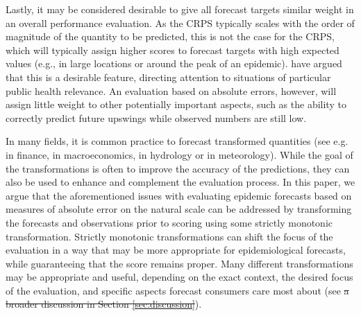 \documentclass[10pt,letterpaper]{article} %
\providecommand{\DIFaddtex}[1]{{\protect\color{blue}\uwave{#1}}} %
\providecommand{\DIFdeltex}[1]{{\protect\color{red}\sout{#1}}}                      %
\providecommand{\DIFaddbegin}{} %
\providecommand{\DIFaddend}{} %
\providecommand{\DIFdelbegin}{} %
\providecommand{\DIFdelend}{} %
\providecommand{\DIFadd}[1]{\texorpdfstring{\DIFaddtex{#1}}{#1}} %
\providecommand{\DIFdel}[1]{\texorpdfstring{\DIFdeltex{#1}}{}} %
\newcommand{\DIFscaledelfig}{0.5}
\newlength{\DIFdelgraphicswidth} %
\newlength{\DIFdelgraphicsheight} %
\newcommand{\DIFaddincludegraphics}[2][]{{\color{blue}\fbox{\DIFOincludegraphics[#1]{#2}}}} %
\newcommand{\DIFdelincludegraphics}[2][]{%
\sbox{\DIFdelgraphicsbox}{\DIFOincludegraphics[#1]{#2}}%
\settoboxwidth{\DIFdelgraphicswidth}{\DIFdelgraphicsbox} %
\settoboxtotalheight{\DIFdelgraphicsheight}{\DIFdelgraphicsbox} %
\scalebox{\DIFscaledelfig}{%
\parbox[b]{\DIFdelgraphicswidth}{\usebox{\DIFdelgraphicsbox}\\[-\baselineskip] \rule{\DIFdelgraphicswidth}{0em}}\llap{\resizebox{\DIFdelgraphicswidth}{\DIFdelgraphicsheight}{%
\setlength{\unitlength}{\DIFdelgraphicswidth}%
\begin{picture}(1,1)%
\thicklines\linethickness{2pt} %
{\color[rgb]{1,0,0}\put(0,0){\framebox(1,1){}}}%
{\color[rgb]{1,0,0}\put(0,0){\line( 1,1){1}}}%
{\color[rgb]{1,0,0}\put(0,1){\line(1,-1){1}}}%
\end{picture}%
}\hspace*{3pt}}} %
} %
\DeclareRobustCommand{\DIFaddbegin}{\DIFOaddbegin \let\includegraphics\DIFaddincludegraphics} %
\DeclareRobustCommand{\DIFaddend}{\DIFOaddend \let\includegraphics\DIFOincludegraphics} %
\DeclareRobustCommand{\DIFdelbegin}{\DIFOdelbegin \let\includegraphics\DIFdelincludegraphics} %
\DeclareRobustCommand{\DIFdelend}{\DIFOaddend \let\includegraphics\DIFOincludegraphics} %
\begin{document}
Lastly, it may be considered desirable to give all forecast targets similar weight in an overall performance evaluation. As the CRPS typically scales with the order of magnitude of the quantity to be predicted, this is not the case for the CRPS, which will typically assign higher scores to forecast targets with high expected values (e.g., in large locations or around the peak of an epidemic). \cite{bracherEvaluatingEpidemicForecasts2021} have argued that this is a desirable feature, directing attention to situations of particular public health relevance. An evaluation based on absolute errors, however, will assign little weight to other potentially important aspects, such as the ability to correctly predict future upswings while observed numbers are still low. 

In many fields, it is common practice to forecast transformed quantities (see e.g. \cite{taylorEvaluatingVolatilityInterval1999} in finance, \cite{mayrLogLevelVAR2015} in macroeconomics, \cite{loweStochasticRainfallrunoffForecasting2014} in hydrology or \cite{fuglstadDoesNonstationarySpatial2015} in meteorology). While the goal of the transformations is often to improve the accuracy of the predictions, they can also be used to enhance and complement the evaluation process. 
In this paper, we argue that the aforementioned issues with evaluating epidemic forecasts based on measures of absolute error on the natural scale can be addressed by transforming the forecasts and observations prior to scoring using some strictly monotonic transformation. Strictly monotonic transformations can shift the focus of the evaluation in a way that may be more appropriate for epidemiological forecasts, while guaranteeing that the score remains proper. Many different transformations may be appropriate and useful, depending on the exact context, the desired focus of the evaluation, and specific aspects forecast consumers care most about (see \DIFdelbegin \DIFdel{a broader discussion in Section \ref{sec:discussion}}\DIFdelend \DIFaddbegin \DIFadd{Discussion}\DIFaddend ). 
\end{document}
